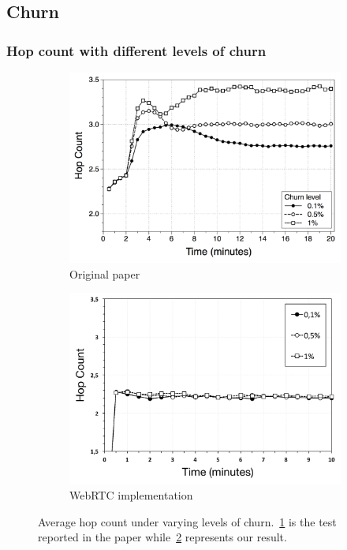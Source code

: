 \documentclass{beamer}
\begin{document}
\subsection{Churn}

\begin{frame}
\frametitle{Hop count with different levels of churn}
    
\begin{figure}
\centering
\begin{subfigure}{.5\textwidth}
  \centering
  \includegraphics[keepaspectratio=true, width=1\linewidth]{images/paper_average_hop_count_churn}
  \caption{Original paper}
  \label{fig:paper_average_hop_count_churn}
\end{subfigure}%
\begin{subfigure}{.5\textwidth}
  \centering
  \includegraphics[keepaspectratio=true, width=1\linewidth]{images/average_hop_count_churn_1impl}
  \caption{WebRTC implementation}
  \label{fig:average_hop_count_churn_1impl}
\end{subfigure}
\caption{Average hop count under varying levels of churn.~\ref{fig:paper_average_hop_count_churn} is the test reported in the paper while~\ref{fig:average_hop_count_churn_1impl} represents our result.}
\label{fig:robustness_hop_count_churn}
\end{figure}

\end{frame}
\end{document}

